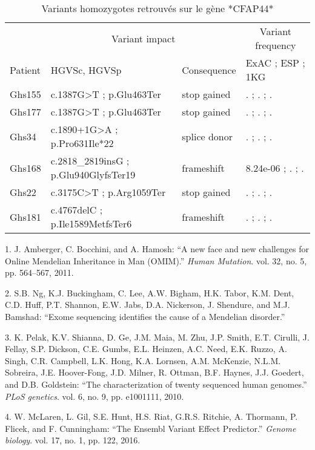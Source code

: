 \documentclass[12pt,twoside]{ugathesis}
\begin{document}
\begin{longtable}[t]{llll}
\caption{\label{tab:tabcfap44}Variants homozygotes retrouvés sur le gène *CFAP44*}\\
\toprule
\multicolumn{1}{c}{ } & \multicolumn{2}{c}{Variant impact} & \multicolumn{1}{c}{Variant frequency} \\
\cmidrule(l{2pt}r{2pt}){2-3} \cmidrule(l{2pt}r{2pt}){4-4}
Patient & HGVSc, HGVSp & Consequence & ExAC ; ESP ; 1KG\\
\midrule
Ghs155 & c.1387G>T ; p.Glu463Ter & stop gained & . ; . ; .\\
Ghs177 & c.1387G>T ; p.Glu463Ter & stop gained & . ; . ; .\\
Ghs34 & c.1890+1G>A ; p.Pro631Ile*22 & splice donor & . ; . ; .\\
Ghs168 & c.2818\_2819insG ; p.Glu940GlyfsTer19 & frameshift & 8.24e-06 ; . ; .\\
Ghs22 & c.3175C>T ; p.Arg1059Ter & stop gained & . ; . ; .\\
Ghs181 & c.4767delC ; p.Ile1589MetfsTer6 & frameshift & . ; . ; .\\
\bottomrule
\end{longtable}

\hypertarget{refs}{}
\hypertarget{ref-Amberger2011}{}
1. J. Amberger, C. Bocchini, and A. Hamosh: ``A new face and new
challenges for Online Mendelian Inheritance in Man (OMIM).'' \emph{Human
Mutation}. vol. 32, no. 5, pp. 564--567, 2011.

\hypertarget{ref-Ng}{}
2. S.B. Ng, K.J. Buckingham, C. Lee, A.W. Bigham, H.K. Tabor, K.M. Dent,
C.D. Huff, P.T. Shannon, E.W. Jabs, D.A. Nickerson, J. Shendure, and
M.J. Bamshad: ``Exome sequencing identifies the cause of a Mendelian
disorder.''

\hypertarget{ref-Pelak2010}{}
3. K. Pelak, K.V. Shianna, D. Ge, J.M. Maia, M. Zhu, J.P. Smith, E.T.
Cirulli, J. Fellay, S.P. Dickson, C.E. Gumbs, E.L. Heinzen, A.C. Need,
E.K. Ruzzo, A. Singh, C.R. Campbell, L.K. Hong, K.A. Lornsen, A.M.
McKenzie, N.L.M. Sobreira, J.E. Hoover-Fong, J.D. Milner, R. Ottman,
B.F. Haynes, J.J. Goedert, and D.B. Goldstein: ``The characterization of
twenty sequenced human genomes.'' \emph{PLoS genetics}. vol. 6, no. 9,
pp. e1001111, 2010.

\hypertarget{ref-McLaren2016}{}
4. W. McLaren, L. Gil, S.E. Hunt, H.S. Riat, G.R.S. Ritchie, A.
Thormann, P. Flicek, and F. Cunningham: ``The Ensembl Variant Effect
Predictor.'' \emph{Genome biology}. vol. 17, no. 1, pp. 122, 2016.
\end{document}
